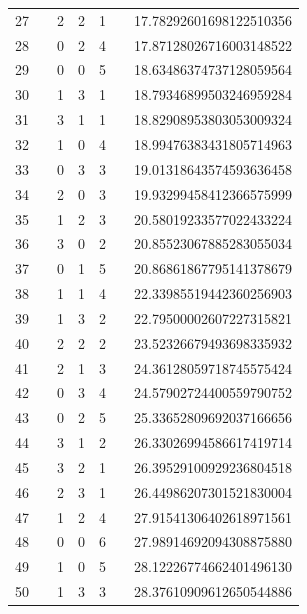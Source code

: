 \documentclass{article}
\begin{document}
\begin{table}[htbp]
\begin{tabular}{c|c|c|c|c|c|c}
27 &   & 2 & 2 & 1 &   & 17.78292601698122510356 \\
28 &   & 0 & 2 & 4 &   & 17.87128026716003148522 \\
29 &   & 0 & 0 & 5 &   & 18.63486374737128059564 \\
30 &   & 1 & 3 & 1 &   & 18.79346899503246959284 \\
31 &   & 3 & 1 & 1 &   & 18.82908953803053009324 \\
32 &   & 1 & 0 & 4 &   & 18.99476383431805714963 \\
33 &   & 0 & 3 & 3 &   & 19.01318643574593636458 \\
34 &   & 2 & 0 & 3 &   & 19.93299458412366575999 \\
35 &   & 1 & 2 & 3 &   & 20.58019233577022433224 \\
36 &   & 3 & 0 & 2 &   & 20.85523067885283055034 \\
37 &   & 0 & 1 & 5 &   & 20.86861867795141378679 \\
38 &   & 1 & 1 & 4 &   & 22.33985519442360256903 \\
39 &   & 1 & 3 & 2 &   & 22.79500002607227315821 \\
40 &   & 2 & 2 & 2 &   & 23.52326679493698335932 \\
41 &   & 2 & 1 & 3 &   & 24.36128059718745575424 \\
42 &   & 0 & 3 & 4 &   & 24.57902724400559790752 \\
43 &   & 0 & 2 & 5 &   & 25.33652809692037166656 \\
44 &   & 3 & 1 & 2 &   & 26.33026994586617419714 \\
45 &   & 3 & 2 & 1 &   & 26.39529100929236804518 \\
46 &   & 2 & 3 & 1 &   & 26.44986207301521830004 \\
47 &   & 1 & 2 & 4 &   & 27.91541306402618971561 \\
48 &   & 0 & 0 & 6 &   & 27.98914692094308875880 \\
49 &   & 1 & 0 & 5 &   & 28.12226774662401496130 \\
50 &   & 1 & 3 & 3 &   & 28.37610909612650544886 \\
\bottomrule
\end{tabular}
\end{table}
\end{document}
